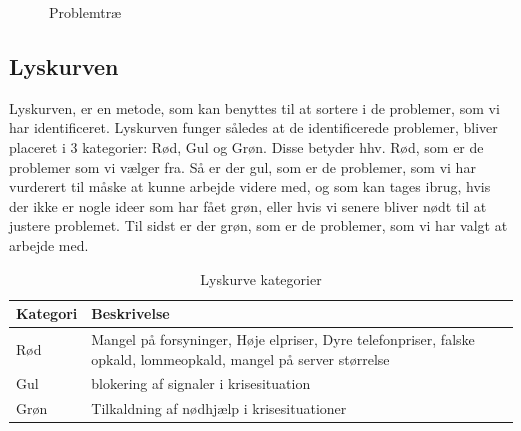 \begin{figure}[H]
    \centering
    \label{fig:problemtræ}
    \caption{Problemtræ}
\end{figure}


\subsection{Lyskurven}
Lyskurven, er en metode, som kan benyttes til at sortere i de problemer, som vi har identificeret. Lyskurven funger således at de identificerede problemer, bliver placeret i 3 kategorier: Rød, Gul og Grøn. Disse betyder hhv. Rød, som er de problemer som vi vælger fra. Så er der gul, som er de problemer, som vi har vurderert til måske at kunne arbejde videre med, og som kan tages ibrug, hvis der ikke er nogle ideer som har fået grøn, eller hvis vi senere bliver nødt til at justere problemet. Til sidst er der grøn, som er de problemer, som vi har valgt at arbejde med.

\begin{table}[H]
\centering
\begin{tabular}{|p{}|p{}|}
\hline
\textbf{Kategori} & \textbf{Beskrivelse} \\
\hline
Rød & Mangel på forsyninger, Høje elpriser, Dyre telefonpriser, falske opkald, lommeopkald, mangel på server størrelse \\
\hline
Gul & blokering af signaler i krisesituation \\
\hline
Grøn & Tilkaldning af nødhjælp i krisesituationer \\
\hline
\end{tabular}
\caption{Lyskurve kategorier}
\label{tab:lyskurve}
\end{table}

